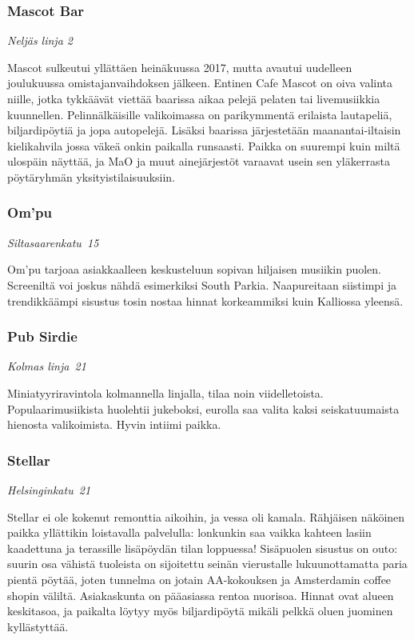\documentclass[../ala_hataile.tex]{subfiles}
\begin{document}
\subsubsection*{Mascot Bar}
\textit{Neljäs linja 2}

Mascot sulkeutui yllättäen heinäkuussa 2017, mutta avautui uudelleen joulukuussa omistajanvaihdoksen jälkeen. Entinen Cafe Mascot on oiva valinta niille, jotka tykkäävät viettää baarissa aikaa pelejä pelaten tai livemusiikkia kuunnellen. Pelinnälkäisille valikoimassa on parikymmentä erilaista lautapeliä, biljardipöytiä ja jopa autopelejä. Lisäksi baarissa järjestetään maanantai-iltaisin kielikahvila jossa väkeä onkin paikalla runsaasti. Paikka on suurempi kuin miltä ulospäin näyttää, ja MaO ja muut ainejärjestöt varaavat usein sen yläkerrasta pöytäryhmän yksityistilaisuuksiin.
\subsubsection*{Om'pu}
\textit{Siltasaarenkatu~15}

Om'pu tarjoaa asiakkaalleen keskusteluun
sopivan hiljaisen musiikin puolen. Screeniltä
voi joskus nähdä esimerkiksi South
Parkia. Naapureitaan
siistimpi ja trendikkäämpi
sisustus tosin nostaa hinnat korkeammiksi
kuin Kalliossa yleensä.
\subsubsection*{Pub Sirdie}
\textit{Kolmas linja~21}

Miniatyyriravintola kolmannella linjalla,
tilaa noin viidelletoista. Populaarimusiikista
huolehtii jukeboksi, eurolla saa valita kaksi seiskatuumaista hienosta valikoimista.
Hyvin intiimi paikka.
\subsubsection*{Stellar}
\textit{Helsinginkatu~21}

Stellar ei ole kokenut remonttia aikoihin,
ja vessa oli kamala. Rähjäisen näköinen
paikka yllättikin loistavalla palvelulla:
lonkunkin saa vaikka kahteen lasiin kaadettuna
ja terassille lisäpöydän tilan loppuessa!
Sisäpuolen sisustus on outo: suurin osa
vähistä tuoleista on sijoitettu seinän vierustalle
lukuunottamatta paria pientä pöytää,
joten tunnelma on jotain AA-kokouksen
ja Amsterdamin coffee shopin väliltä. Asiakaskunta
on pääasiassa rentoa nuorisoa.
Hinnat ovat alueen keskitasoa, ja paikalta
löytyy myös biljardipöytä mikäli pelkkä
oluen juominen kyllästyttää.
\end{document}
